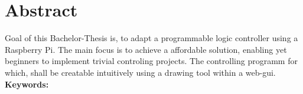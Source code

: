 \section*{Abstract}
\begin{quote}\textit{ \TitelEn}\end{quote}
Goal of this Bachelor-Thesis is, to adapt a programmable logic controller using a Raspberry Pi. The main focus is to achieve a affordable solution, enabling yet beginners to implement trivial controling projects. The controlling programm for which, shall be creatable intuitively using a drawing tool within a web-gui.
\\[0.5cm]
\textbf{Keywords:} \keywordsEn
\newpage

